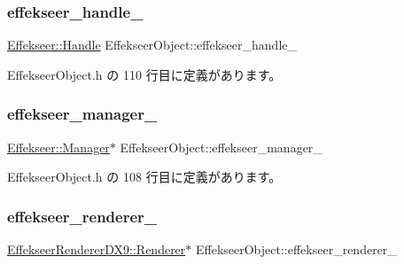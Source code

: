\subsubsection{\texorpdfstring{effekseer\+\_\+handle\+\_\+}{effekseer\_handle\_}}
{\footnotesize\ttfamily \mbox{\hyperlink{namespace_effekseer_afba58b8d812da862190e9bbfc040824a}{Effekseer\+::\+Handle}} Effekseer\+Object\+::effekseer\+\_\+handle\+\_\+\hspace{0.3cm}{\ttfamily [private]}}



 Effekseer\+Object.\+h の 110 行目に定義があります。

\mbox{\label{class_effekseer_object_a9f66433b8cecd6753b478a73f93f8179}} 
\subsubsection{\texorpdfstring{effekseer\+\_\+manager\+\_\+}{effekseer\_manager\_}}
{\footnotesize\ttfamily \mbox{\hyperlink{class_effekseer_1_1_manager}{Effekseer\+::\+Manager}}$\ast$ Effekseer\+Object\+::effekseer\+\_\+manager\+\_\+\hspace{0.3cm}{\ttfamily [private]}}



 Effekseer\+Object.\+h の 108 行目に定義があります。

\mbox{\label{class_effekseer_object_a39d29eb6a967f325b3d8659c231e0525}} 
\subsubsection{\texorpdfstring{effekseer\+\_\+renderer\+\_\+}{effekseer\_renderer\_}}
{\footnotesize\ttfamily \mbox{\hyperlink{class_effekseer_renderer_d_x9_1_1_renderer}{Effekseer\+Renderer\+D\+X9\+::\+Renderer}}$\ast$ Effekseer\+Object\+::effekseer\+\_\+renderer\+\_\+\hspace{0.3cm}{\ttfamily [private]}}



